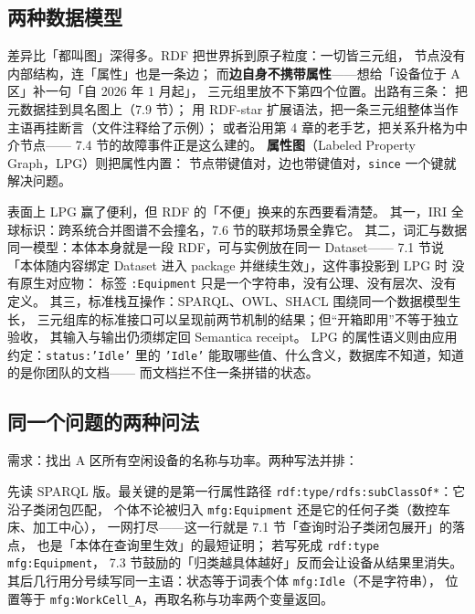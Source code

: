 \subsection{两种数据模型}



差异比「都叫图」深得多。RDF 把世界拆到原子粒度：一切皆三元组，
节点没有内部结构，连「属性」也是一条边；
而\textbf{边自身不携带属性}——想给「设备位于 A 区」补一句「自 2026 年 1 月起」，
三元组里放不下第四个位置。出路有三条：
把元数据挂到具名图上（7.9 节）；
用 RDF-star 扩展语法，把一条三元组整体当作主语再挂断言（文件注释给了示例）；
或者沿用第 4 章的老手艺，把关系升格为中介节点——
7.4 节的故障事件正是这么建的。
\textbf{属性图}（Labeled Property Graph，LPG）则把属性内置：
节点带键值对，边也带键值对，\texttt{since} 一个键就解决问题。

表面上 LPG 赢了便利，但 RDF 的「不便」换来的东西要看清楚。
其一，IRI 全球标识：跨系统合并图谱不会撞名，7.6 节的联邦场景全靠它。
其二，词汇与数据同一模型：本体本身就是一段 RDF，可与实例放在同一 Dataset——
7.1 节说「本体随内容绑定 Dataset 进入 package 并继续生效」，这件事投影到 LPG 时
没有原生对应物：
标签 \texttt{:Equipment} 只是一个字符串，没有公理、没有层次、没有定义。
其三，标准栈互操作：SPARQL、OWL、SHACL 围绕同一个数据模型生长，
三元组库的标准接口可以呈现前两节机制的结果；但“开箱即用”不等于独立验收，
其输入与输出仍须绑定回 Semantica receipt。
LPG 的属性语义则由应用约定：\texttt{status:'Idle'} 里的 \texttt{'Idle'}
能取哪些值、什么含义，数据库不知道，知道的是你团队的文档——
而文档拦不住一条拼错的状态。

\subsection{同一个问题的两种问法}

需求：找出 A 区所有空闲设备的名称与功率。两种写法并排：



先读 SPARQL 版。最关键的是第一行属性路径
\texttt{rdf:type/rdfs:subClassOf*}：它沿子类闭包匹配，
个体不论被归入 \texttt{mfg:Equipment} 还是它的任何子类（数控车床、加工中心），
一网打尽——这一行就是 7.1 节「查询时沿子类闭包展开」的落点，
也是「本体在查询里生效」的最短证明；
若写死成 \texttt{rdf:type mfg:Equipment}，
7.3 节鼓励的「归类越具体越好」反而会让设备从结果里消失。
其后几行用分号续写同一主语：状态等于词表个体 \texttt{mfg:Idle}（不是字符串），
位置等于 \texttt{mfg:WorkCell\_A}，再取名称与功率两个变量返回。

